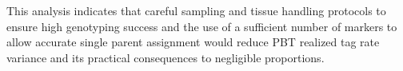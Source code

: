 \documentclass[11pt]{article}
\begin{document}
This analysis indicates that careful sampling and tissue handling protocols to ensure high genotyping success and the use of a sufficient number of markers to allow
accurate single parent assignment would reduce PBT realized tag rate variance and its practical consequences to negligible proportions.



 
\end{document}
